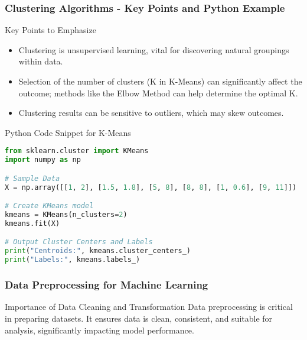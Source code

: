 \documentclass[aspectratio=169]{beamer}
\begin{document}
\begin{frame}[fragile]
    \frametitle{Clustering Algorithms - Key Points and Python Example}
    \begin{block}{Key Points to Emphasize}
        \begin{itemize}
            \item Clustering is unsupervised learning, vital for discovering natural groupings within data.
            \item Selection of the number of clusters (K in K-Means) can significantly affect the outcome; methods like the Elbow Method can help determine the optimal K.
            \item Clustering results can be sensitive to outliers, which may skew outcomes.
        \end{itemize}
    \end{block}
    \begin{block}{Python Code Snippet for K-Means}
        \begin{lstlisting}[language=Python]
from sklearn.cluster import KMeans
import numpy as np

# Sample Data
X = np.array([[1, 2], [1.5, 1.8], [5, 8], [8, 8], [1, 0.6], [9, 11]])

# Create KMeans model
kmeans = KMeans(n_clusters=2)
kmeans.fit(X)

# Output Cluster Centers and Labels
print("Centroids:", kmeans.cluster_centers_)
print("Labels:", kmeans.labels_)
        \end{lstlisting}
    \end{block}
\end{frame}

\begin{frame}[fragile]
    \frametitle{Data Preprocessing for Machine Learning}
    \begin{block}{Importance of Data Cleaning and Transformation}
        Data preprocessing is critical in preparing datasets. It ensures data is clean, consistent, and suitable for analysis, significantly impacting model performance.
    \end{block}
\end{frame}
\end{document}
